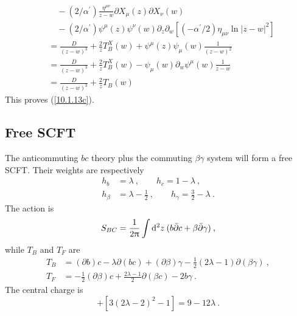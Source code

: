 \begin{tcolorbox}[breakable]
\begin{align*}
		&\quad-(2/\alpha ^{\prime })\frac{\eta ^{\mu \nu }}{z-w}\partial X_{\mu
		}(z)\partial X_{\nu }(w)\\
		&\quad-(2/\alpha ^{\prime })\psi ^{\mu }(z)\psi ^{\nu
		}(w)\partial _{z}\partial _{w}[(-\alpha ^{\prime }/2)\eta _{\mu \nu }\ln
		|z-w|^{2}] \\
		&=\frac{D}{(z-w)^{3}}+\frac{2}{z}T_{B}^{X}(w)+\psi ^{\mu }(z)\psi _{\mu }(w)%
		\frac{1}{(z-w)^{2}} \\
		&=\frac{D}{(z-w)^{3}}+\frac{2}{z}T_{B}^{X}(w)-\psi _{\mu }(w)\partial
		_{w}\psi ^{\mu }(w)\frac{1}{z-w} \\
		&=\frac{D}{(z-w)^{3}}+\frac{2}{z}T_{B}(w)
	\end{align*}
	This proves (\ref{10.1.13c}).
\end{tcolorbox}

\subsection*{Free SCFT}
The anticommuting $bc$ theory plus the commuting $\beta\gamma$ system will form a free SCFT. Their weights are respectively
\begin{subequations}
	\begin{align}
		h_{b}&=\lambda\:,\qquad h_{c}=1-\lambda \:, \label{10.1.16a} \\
		h_{\beta}&=\lambda-\tfrac{1}{2}\:,\qquad h_{\gamma}=\tfrac{3}{2}-\lambda \:. \label{10.1.16b}
	\end{align}
\end{subequations}
The action is
\begin{equation}
	S_{BC}=\frac{1}{2\uppi}\int\mathrm{d}^{2}z\: (b\bar{\partial}c+\beta\bar{\partial}\gamma)\:, \label{10.1.17}
\end{equation}
while $T_{B}$ and $T_{F}$ are
\begin{subequations}
	\begin{align}
		T_{B}&=(\partial b)c-\lambda\partial(bc)+(\partial \beta)\gamma-\frac{1}{2}(2\lambda-1)\partial(\beta\gamma)\:,
		\label{10.1.18a} \\
		T_{F}&=-\frac{1}{2}(\partial \beta)c+ \frac{2\lambda-1}{2}\partial(\beta c)-2b\gamma\:.\label{10.1.18b}
	\end{align}
\end{subequations}
The central charge is
\begin{equation}
	[-3(2\lambda-1)^{2}+1]+[3(2\lambda-2)^{2}-1]=9-12\lambda\:.\label{10.1.19}
\end{equation}
